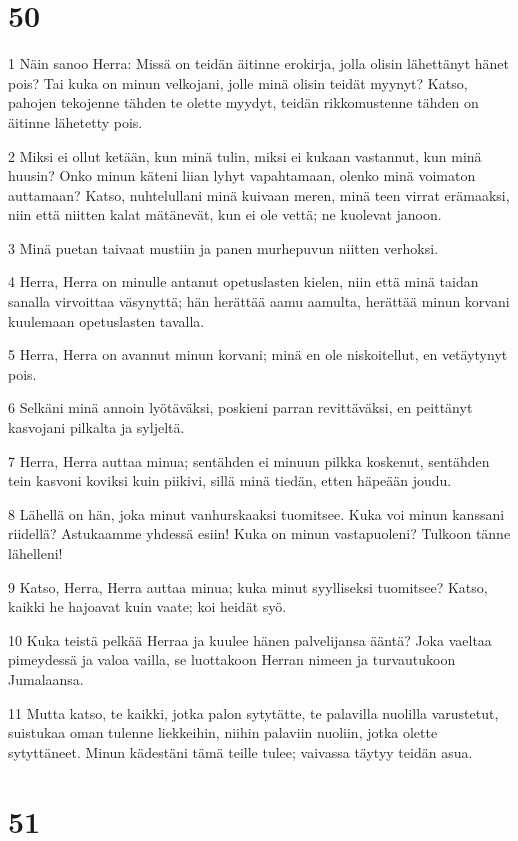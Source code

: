 \chapter{50}

\par 1 Näin sanoo Herra: Missä on teidän äitinne erokirja, jolla olisin lähettänyt hänet pois? Tai kuka on minun velkojani, jolle minä olisin teidät myynyt? Katso, pahojen tekojenne tähden te olette myydyt, teidän rikkomustenne tähden on äitinne lähetetty pois.
\par 2 Miksi ei ollut ketään, kun minä tulin, miksi ei kukaan vastannut, kun minä huusin? Onko minun käteni liian lyhyt vapahtamaan, olenko minä voimaton auttamaan? Katso, nuhtelullani minä kuivaan meren, minä teen virrat erämaaksi, niin että niitten kalat mätänevät, kun ei ole vettä; ne kuolevat janoon.
\par 3 Minä puetan taivaat mustiin ja panen murhepuvun niitten verhoksi.
\par 4 Herra, Herra on minulle antanut opetuslasten kielen, niin että minä taidan sanalla virvoittaa väsynyttä; hän herättää aamu aamulta, herättää minun korvani kuulemaan opetuslasten tavalla.
\par 5 Herra, Herra on avannut minun korvani; minä en ole niskoitellut, en vetäytynyt pois.
\par 6 Selkäni minä annoin lyötäväksi, poskieni parran revittäväksi, en peittänyt kasvojani pilkalta ja syljeltä.
\par 7 Herra, Herra auttaa minua; sentähden ei minuun pilkka koskenut, sentähden tein kasvoni koviksi kuin piikivi, sillä minä tiedän, etten häpeään joudu.
\par 8 Lähellä on hän, joka minut vanhurskaaksi tuomitsee. Kuka voi minun kanssani riidellä? Astukaamme yhdessä esiin! Kuka on minun vastapuoleni? Tulkoon tänne lähelleni!
\par 9 Katso, Herra, Herra auttaa minua; kuka minut syylliseksi tuomitsee? Katso, kaikki he hajoavat kuin vaate; koi heidät syö.
\par 10 Kuka teistä pelkää Herraa ja kuulee hänen palvelijansa ääntä? Joka vaeltaa pimeydessä ja valoa vailla, se luottakoon Herran nimeen ja turvautukoon Jumalaansa.
\par 11 Mutta katso, te kaikki, jotka palon sytytätte, te palavilla nuolilla varustetut, suistukaa oman tulenne liekkeihin, niihin palaviin nuoliin, jotka olette sytyttäneet. Minun kädestäni tämä teille tulee; vaivassa täytyy teidän asua.

\chapter{51}

